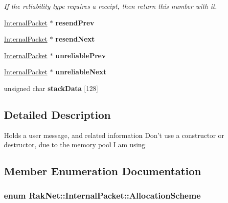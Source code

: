 \begin{DoxyCompactItemize}
\begin{DoxyCompactList}\small\item\em If the reliability type requires a receipt, then return this number with it. \end{DoxyCompactList}\item 
\hypertarget{struct_rak_net_1_1_internal_packet_ab3a9d42c4aad112521ba7efa6451c01a}{\hyperlink{struct_rak_net_1_1_internal_packet}{Internal\-Packet} $\ast$ {\bfseries resend\-Prev}}\label{struct_rak_net_1_1_internal_packet_ab3a9d42c4aad112521ba7efa6451c01a}

\item 
\hypertarget{struct_rak_net_1_1_internal_packet_a24d986084117197716bb4b2e4dc7238f}{\hyperlink{struct_rak_net_1_1_internal_packet}{Internal\-Packet} $\ast$ {\bfseries resend\-Next}}\label{struct_rak_net_1_1_internal_packet_a24d986084117197716bb4b2e4dc7238f}

\item 
\hypertarget{struct_rak_net_1_1_internal_packet_a5d54d8c4a8e1cdfc1b507cc54f4a05e5}{\hyperlink{struct_rak_net_1_1_internal_packet}{Internal\-Packet} $\ast$ {\bfseries unreliable\-Prev}}\label{struct_rak_net_1_1_internal_packet_a5d54d8c4a8e1cdfc1b507cc54f4a05e5}

\item 
\hypertarget{struct_rak_net_1_1_internal_packet_ab23d7294422d4def68e13543c11ab27f}{\hyperlink{struct_rak_net_1_1_internal_packet}{Internal\-Packet} $\ast$ {\bfseries unreliable\-Next}}\label{struct_rak_net_1_1_internal_packet_ab23d7294422d4def68e13543c11ab27f}

\item 
\hypertarget{struct_rak_net_1_1_internal_packet_ad4dcbe3a0174e1edcd0106c73654d238}{unsigned char {\bfseries stack\-Data} \mbox{[}128\mbox{]}}\label{struct_rak_net_1_1_internal_packet_ad4dcbe3a0174e1edcd0106c73654d238}

\end{DoxyCompactItemize}


\subsection{Detailed Description}
Holds a user message, and related information Don't use a constructor or destructor, due to the memory pool I am using 

\subsection{Member Enumeration Documentation}
\hypertarget{struct_rak_net_1_1_internal_packet_a902a05c67f6c8f288e33a9fb0015e196}{
\subsubsection[{Allocation\-Scheme}]{\setlength{\rightskip}{0pt plus 5cm}enum {\bf Rak\-Net\-::\-Internal\-Packet\-::\-Allocation\-Scheme}}}\label{struct_rak_net_1_1_internal_packet_a902a05c67f6c8f288e33a9fb0015e196}


